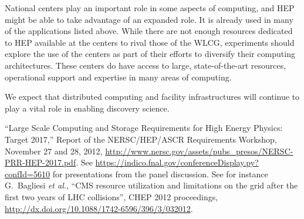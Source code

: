 National centers play an important role in some aspects of computing, and HEP might be able to take advantage of an expanded role.  It is already used in many of the applications listed above.  While there are not enough resources dedicated to HEP available at the centers to rival those of the WLCG, experiments should explore the use of the centers as part of their efforts to diversify their computing architectures.  These centers do have access to large, state-of-the-art resources, operational support and expertise in many areas of computing.

We expect that distributed computing and facility infrastructures will continue to play a vital role in enabling discovery science.


\begin{thebibliography}{99}
 ``Large Scale Computing and Storage Requirements for High Energy Physics: Target 2017,'' Report of the NERSC/HEP/ASCR Requirements Workshop, November 27 and 28, 2012, \url{http://www.nersc.gov/assets/pubs_presos/NERSC-PRR-HEP-2017.pdf}.
 See \url{https://indico.fnal.gov/conferenceDisplay.py?confId=5610} for presentations from the panel discussion.
 See for instance G.~Bagliesi {\it et al.}, ``CMS resource utilization and limitations on the grid after the first two years of LHC collisions'', CHEP 2012 proceedings, \url{http://dx.doi.org/10.1088/1742-6596/396/3/032012}.
\end{thebibliography}



